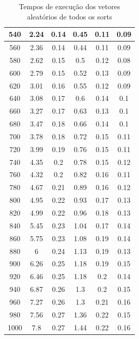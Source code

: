 \documentclass[10pt,a4paper]{article}
\begin{document}
\begin{center}
\begin{table}
\begin{tabular}{| c | c | c | c | c | c |}
540 & 2.24 & 0.14 & 0.45 & 0.11 & 0.09 \\ \hline 
560 & 2.36 & 0.14 & 0.44 & 0.11 & 0.09 \\ \hline 
580 & 2.62 & 0.15 & 0.5 & 0.12 & 0.08 \\ \hline 
600 & 2.79 & 0.15 & 0.52 & 0.13 & 0.09 \\ \hline 
620 & 3.01 & 0.16 & 0.55 & 0.12 & 0.09 \\ \hline 
640 & 3.08 & 0.17 & 0.6 & 0.14 & 0.1 \\ \hline 
660 & 3.27 & 0.17 & 0.63 & 0.13 & 0.1 \\ \hline 
680 & 3.47 & 0.18 & 0.66 & 0.14 & 0.1 \\ \hline 
700 & 3.78 & 0.18 & 0.72 & 0.15 & 0.11 \\ \hline 
720 & 3.99 & 0.19 & 0.76 & 0.15 & 0.11 \\ \hline 
740 & 4.35 & 0.2 & 0.78 & 0.15 & 0.12 \\ \hline 
760 & 4.32 & 0.2 & 0.82 & 0.16 & 0.11 \\ \hline 
780 & 4.67 & 0.21 & 0.89 & 0.16 & 0.12 \\ \hline 
800 & 4.95 & 0.22 & 0.93 & 0.17 & 0.13 \\ \hline 
820 & 4.99 & 0.22 & 0.96 & 0.18 & 0.13 \\ \hline 
840 & 5.45 & 0.23 & 1.04 & 0.17 & 0.14 \\ \hline 
860 & 5.75 & 0.23 & 1.08 & 0.19 & 0.14 \\ \hline 
880 & 6 & 0.24 & 1.13 & 0.19 & 0.13 \\ \hline 
900 & 6.26 & 0.25 & 1.18 & 0.19 & 0.15 \\ \hline 
920 & 6.46 & 0.25 & 1.18 & 0.2 & 0.14 \\ \hline 
940 & 6.87 & 0.26 & 1.3 & 0.2 & 0.15 \\ \hline 
960 & 7.27 & 0.26 & 1.3 & 0.21 & 0.16 \\ \hline 
980 & 7.56 & 0.27 & 1.36 & 0.22 & 0.15 \\ \hline 
1000 & 7.8 & 0.27 & 1.44 & 0.22 & 0.16 \\ \hline 
\end{tabular}
\caption{Tempos de execução dos vetores aleatórios de todos os sorts}
\label{table:sorts_random}
\end{table}
\end{center}
\end{document}
